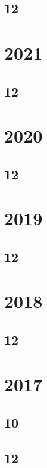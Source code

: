 \subsection{12}


\section{2021}
\subsection{12}

\section{2020}
\subsection{12}

\section{2019}
\subsection{12}





\section{2018}
\subsection{12}




\section{2017}
\subsection{10}

\subsection{12}


